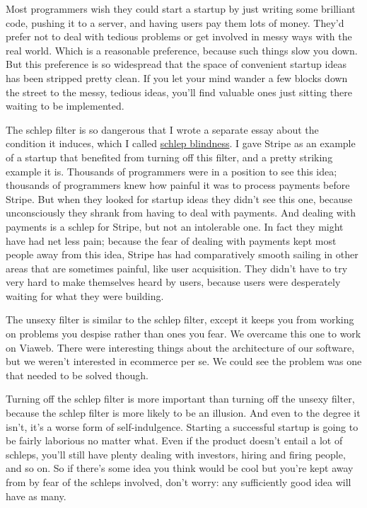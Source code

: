 Most programmers wish they could start a startup by just writing some
brilliant code, pushing it to a server, and having users pay them lots
of money. They'd prefer not to deal with tedious problems or get
involved in messy ways with the real world. Which is a reasonable
preference, because such things slow you down. But this preference is so
widespread that the space of convenient startup ideas has been stripped
pretty clean. If you let your mind wander a few blocks down the street
to the messy, tedious ideas, you'll find valuable ones just sitting
there waiting to be implemented.

The schlep filter is so dangerous that I wrote a separate essay about
the condition it induces, which I called \href{schlep.html}{schlep
blindness}. I gave Stripe as an example of a startup that benefited from
turning off this filter, and a pretty striking example it is. Thousands
of programmers were in a position to see this idea; thousands of
programmers knew how painful it was to process payments before Stripe.
But when they looked for startup ideas they didn't see this one, because
unconsciously they shrank from having to deal with payments. And dealing
with payments is a schlep for Stripe, but not an intolerable one. In
fact they might have had net less pain; because the fear of dealing with
payments kept most people away from this idea, Stripe has had
comparatively smooth sailing in other areas that are sometimes painful,
like user acquisition. They didn't have to try very hard to make
themselves heard by users, because users were desperately waiting for
what they were building.

The unsexy filter is similar to the schlep filter, except it keeps you
from working on problems you despise rather than ones you fear. We
overcame this one to work on Viaweb. There were interesting things about
the architecture of our software, but we weren't interested in ecommerce
per se. We could see the problem was one that needed to be solved
though.

Turning off the schlep filter is more important than turning off the
unsexy filter, because the schlep filter is more likely to be an
illusion. And even to the degree it isn't, it's a worse form of
self-indulgence. Starting a successful startup is going to be fairly
laborious no matter what. Even if the product doesn't entail a lot of
schleps, you'll still have plenty dealing with investors, hiring and
firing people, and so on. So if there's some idea you think would be
cool but you're kept away from by fear of the schleps involved, don't
worry: any sufficiently good idea will have as many.

